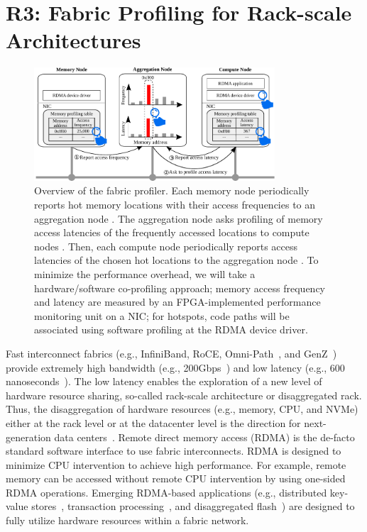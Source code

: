 \section{R3: Fabric Profiling for Rack-scale Architectures}
\label{sec:fabricprofile}

\begin{figure}[!t]
  \centering
  \includegraphics[width=0.8\textwidth]{fig/fabric-prof}
  \caption{
    Overview of the fabric profiler. Each memory node periodically
    reports hot memory locations with their access frequencies to an
    aggregation node \protect{}. The aggregation node asks
    profiling of memory access latencies of the frequently accessed
    locations to compute nodes \protect{}. Then, each compute node
    periodically reports access latencies of the chosen hot locations
    to the aggregation node \protect{}. To minimize the performance
    overhead, we will take a hardware/software co-profiling approach;
    memory access frequency and latency are measured by an
    FPGA-implemented performance monitoring unit on a NIC;
    for hotspots, code paths will be associated using software
    profiling at the RDMA device driver.
  }
\label{f:fabric-overview}
\vspace{-5px}
\end{figure}

Fast interconnect fabrics (e.g., InfiniBand, RoCE,
Omni-Path~\cite{omnipath:web}, and GenZ~\cite{genz:web})
provide extremely high bandwidth (e.g.,
200Gbps~\cite{mellanox:200gb:web}) and low latency (e.g., 600
nanoseconds~\cite{mellanox:200gb:web}).
%
The low latency enables the exploration of a new level of hardware resource
sharing, so-called rack-scale architecture or disaggregated rack. Thus, the
disaggregation of hardware resources (e.g., memory, CPU, and NVMe) either at
the rack level or at the datacenter level is the direction for next-generation
data centers~\cite{sangjin:disaggregation, peter:disaggregation,
  ana:flash, rackintel:web, facebook:rackscale:web,
  oracle:sonoma:web}.
%
Remote direct memory access (RDMA) is the de-facto standard software
interface to use fabric interconnects. RDMA is designed to minimize
CPU intervention to achieve high performance. For example, remote
memory can be accessed without remote CPU intervention by using
one-sided RDMA operations. Emerging RDMA-based applications (e.g.,
distributed key-value stores~\cite{john:ramcloud, anuj:herd,
  alek:farm}, transaction processing~\cite{anuj:fasst, drtm:sosp15},
and disaggregated flash~\cite{ana:flash}) are designed to fully
utilize hardware resources within a fabric network.

